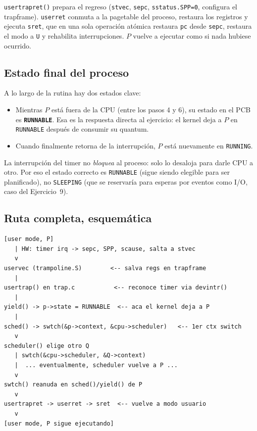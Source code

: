 \documentclass[11pt,a4paper]{article}
\begin{document}
\texttt{usertrapret()} prepara el regreso (\texttt{stvec},
\texttt{sepc}, \texttt{sstatus.SPP=0}, configura el trapframe).
\texttt{userret} conmuta a la pagetable del proceso, restaura los
registros y ejecuta \texttt{sret}, que en una sola operación atómica
restaura \texttt{pc} desde \texttt{sepc}, restaura el modo a \texttt{U}
y rehabilita interrupciones. $P$ vuelve a ejecutar como si nada
hubiese ocurrido.

\subsection*{Estado final del proceso}

A lo largo de la rutina hay dos estados clave:

\begin{itemize}[leftmargin=*,nosep]
    \item Mientras $P$ está fuera de la CPU (entre los pasos 4 y 6), su
        estado en el PCB es \textbf{\texttt{RUNNABLE}}. Esa es la
        respuesta directa al ejercicio: el kernel deja a $P$ en
        \texttt{RUNNABLE} después de consumir su quantum.
    \item Cuando finalmente retorna de la interrupción, $P$ está
        nuevamente en \texttt{RUNNING}.
\end{itemize}

La interrupción del timer no \emph{bloquea} al proceso: solo lo
desaloja para darle CPU a otro. Por eso el estado correcto es
\texttt{RUNNABLE} (sigue siendo elegible para ser planificado), no
\texttt{SLEEPING} (que se reservaría para esperas por eventos como I/O,
caso del Ejercicio~9).

\subsection*{Ruta completa, esquemática}

\begin{lstlisting}[style=textstyle]
[user mode, P]
   | HW: timer irq -> sepc, SPP, scause, salta a stvec
   v
uservec (trampoline.S)        <-- salva regs en trapframe
   |
usertrap() en trap.c           <-- reconoce timer via devintr()
   |
yield() -> p->state = RUNNABLE  <-- aca el kernel deja a P
   |
sched() -> swtch(&p->context, &cpu->scheduler)   <-- 1er ctx switch
   v
scheduler() elige otro Q
   | swtch(&cpu->scheduler, &Q->context)
   |  ... eventualmente, scheduler vuelve a P ...
   v
swtch() reanuda en sched()/yield() de P
   v
usertrapret -> userret -> sret  <-- vuelve a modo usuario
   v
[user mode, P sigue ejecutando]
\end{lstlisting}
\end{document}
